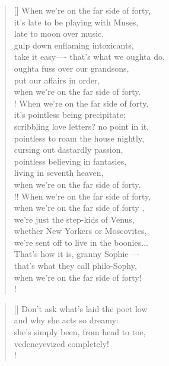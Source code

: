 \documentclass[]{article}
\begin{document}
\vspace*{0.05\textheight}
\settowidth{\versewidth}{When we're on the far side of forty, }
\begin{verse}[\versewidth]
When we're on the far side of forty,\\
it's late to be playing with Muses,\\
late to moon over music,\\
gulp down enflaming intoxicants,\\
take it easy—- that's what we oughta do,\\
oughta fuss over our grandsons,\\
put our affairs in order,\\
when we're on the far side of forty.\\!
When we're on the far side of forty,\\
it's pointless being precipitate;\\
scribbling love letters? no point in it,\\
pointless to roam the house nightly,\\
cursing out dastardly passion,\\
pointless believing in fantasies,\\
living in seventh heaven,\\
when we're on the far side of forty.\\!!
When we're on the far side of forty,\\
when we're on the far side of forty ,\\
we're just the step-kids of Venus,\\
whether New Yorkers or Moscovites,\\
we're sent off to live in the boonies...\\
That's how it is, granny Sophie—- \\
that's what they call philo-Sophy,\\
when we're on the far side of forty!\\!
\end{verse}
\bigskip \bigskip

\settowidth{\versewidth}{Don't ask what's laid the poet low }
\begin{verse}[\versewidth]
Don't ask what's laid the poet low\\
and why she acts so dreamy:\\
she's simply been, from head to toe,\\
vedeneyevized completely!\\!
\end{verse}
\newpage
\end{document}
